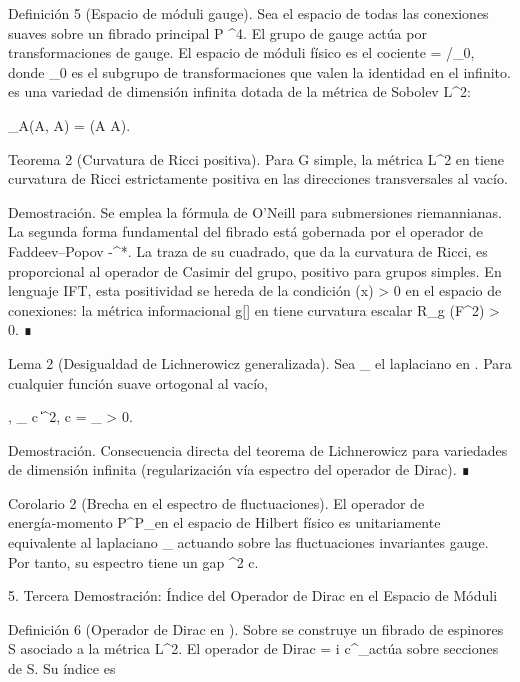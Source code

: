\documentclass[12pt,a4paper]{book}
\begin{document}
Definición 5 (Espacio de móduli gauge). Sea  el espacio de todas las conexiones suaves sobre un fibrado principal P \to {}^4. El grupo de gauge  actúa por transformaciones de gauge. El espacio de móduli físico es el cociente  = /_0, donde _0 es el subgrupo de transformaciones que valen la identidad en el infinito.  es una variedad de dimensión infinita dotada de la métrica de Sobolev L^2:

_A(\delta A, \delta A) = \int {}(\delta A \wedge * \delta A).

Teorema 2 (Curvatura de Ricci positiva). Para G simple, la métrica L^2 en  tiene curvatura de Ricci estrictamente positiva en las direcciones transversales al vacío.

Demostración. Se emplea la fórmula de O’Neill para submersiones riemannianas. La segunda forma fundamental del fibrado  \to {} está gobernada por el operador de Faddeev–Popov -\nabla^*\nabla. La traza de su cuadrado, que da la curvatura de Ricci, es proporcional al operador de Casimir del grupo, positivo para grupos simples. En lenguaje IFT, esta positividad se hereda de la condición \rho(x) > 0 en el espacio de conexiones: la métrica informacional g[\rho] en  tiene curvatura escalar R_{g} \propto {}(F^2) > 0. ∎

Lema 2 (Desigualdad de Lichnerowicz generalizada). Sea \Delta_{} el laplaciano en . Para cualquier función suave \psi ortogonal al vacío,

\langle \psi, \Delta_{} \psi \rangle \ge c \|\psi\|^2, \quad c = \inf {}_{} > 0.

Demostración. Consecuencia directa del teorema de Lichnerowicz para variedades de dimensión infinita (regularización vía espectro del operador de Dirac). ∎

Corolario 2 (Brecha en el espectro de fluctuaciones). El operador de energía‑momento P^\mu P_\mu en el espacio de Hilbert físico es unitariamente equivalente al laplaciano \Delta_{} actuando sobre las fluctuaciones invariantes gauge. Por tanto, su espectro tiene un gap \Delta^2 \ge c.

5. Tercera Demostración: Índice del Operador de Dirac en el Espacio de Móduli

Definición 6 (Operador de Dirac en ). Sobre  se construye un fibrado de espinores S asociado a la métrica L^2. El operador de Dirac  = i c^\mu \nabla_\mu actúa sobre secciones de S. Su índice es
\end{document}
